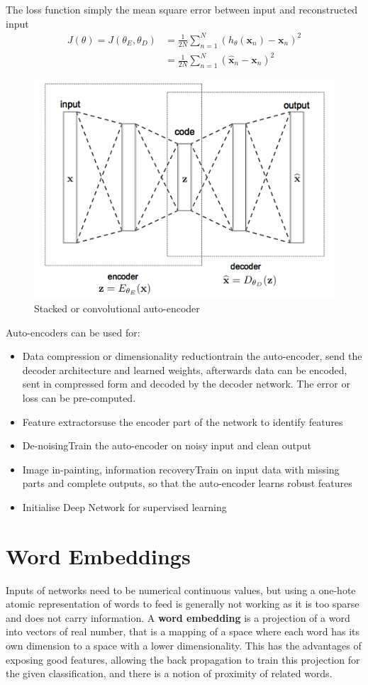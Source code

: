 \documentclass[11pt]{article}
\begin{document}
The loss function simply the mean square error between input and reconstructed input
\begin{align*}
	J(\theta) = J(\theta_E, \theta_D) &= \frac{1}{2N}\sum_{n=1}^{N}(h_\theta(\textbf{x}_n) - \textbf{x}_n)^2\\
	&= \frac{1}{2N}\sum_{n=1}^{N}(\widehat{\textbf{x}}_n - \textbf{x}_n)^2
\end{align*}

\begin{figure}[tbh]
	\centering
	\includegraphics[width=0.6\linewidth]{img/autoencoder_stacked}
	\caption{Stacked or convolutional auto-encoder}
	\label{fig:autoencoderstacked}
\end{figure}

Auto-encoders can be used for:
\begin{itemize}
	\item Data compression or dimensionality reduction\quad train the auto-encoder, send the decoder architecture and learned weights, afterwards data can be encoded, sent in compressed form and decoded by the decoder network. The error or loss can be pre-computed.
	\item Feature extractors\quad use the encoder part of the network to identify features
	\item De-noising\quad Train the auto-encoder on noisy input and clean output
	\item Image in-painting, information recovery\quad Train on input data with missing parts and complete outputs, so that the auto-encoder learns robust features
	\item Initialise Deep Network for supervised learning
\end{itemize}

\section{Word Embeddings}
Inputs of networks need to be numerical continuous values, but using a one-hote atomic representation of words to feed is generally not working as it is too sparse and does not carry information. A \textbf{word embedding} is a projection of a word into vectors of real number, that is a mapping of a space where each word has its own dimension to a space with a lower dimensionality. This has the advantages of exposing good features, allowing the back propagation to train this projection for the given classification, and there is a notion of proximity of related words.
\end{document}
